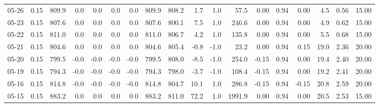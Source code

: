 \begin{threeparttable}
{\begin{tabular}{lrrrrrrrrrrrrrrrrr}
  05-26 &     0.15 & 809.9 &               0.0 &               0.0 &                0.0 &                0.0 & 809.9 & 808.2 &        1.7 &                      1.0 &                57.5 &       0.00 &      0.94 &           0.00 &              4.5 &            0.56 &                  15.00 \\
  05-23 &     0.15 & 807.6 &               0.0 &               0.0 &                0.0 &                0.0 & 807.6 & 800.1 &        7.5 &                      1.0 &               246.6 &       0.00 &      0.94 &           0.00 &              4.9 &            0.62 &                  15.00 \\
  05-22 &     0.15 & 811.0 &               0.0 &               0.0 &                0.0 &                0.0 & 811.0 & 806.7 &        4.2 &                      1.0 &               135.8 &       0.00 &      0.94 &           0.00 &              5.5 &            0.68 &                  15.00 \\
  05-21 &     0.15 & 804.6 &               0.0 &               0.0 &                0.0 &                0.0 & 804.6 & 805.4 &       -0.8 &                     -1.0 &                23.2 &       0.00 &      0.94 &           0.15 &             19.0 &            2.36 &                  20.00 \\
  05-20 &     0.15 & 799.5 &              -0.0 &              -0.0 &               -0.0 &               -0.0 & 799.5 & 808.0 &       -8.5 &                     -1.0 &               254.0 &      -0.15 &      0.94 &           0.00 &             19.4 &            2.40 &                  20.00 \\
  05-19 &     0.15 & 794.3 &              -0.0 &              -0.0 &               -0.0 &               -0.0 & 794.3 & 798.0 &       -3.7 &                     -1.0 &               108.4 &      -0.15 &      0.94 &           0.00 &             19.2 &            2.41 &                  20.00 \\
  05-16 &     0.15 & 814.8 &              -0.0 &              -0.0 &               -0.0 &               -0.0 & 814.8 & 804.7 &       10.1 &                      1.0 &               286.8 &      -0.15 &      0.94 &          -0.15 &             20.8 &            2.59 &                  20.00 \\
  05-15 &     0.15 & 883.2 &               0.0 &               0.0 &                0.0 &                0.0 & 883.2 & 811.0 &       72.2 &                      1.0 &              1991.9 &       0.00 &      0.94 &           0.00 &             20.5 &            2.53 &                  15.00 \\

\end{tabular}}
\end{threeparttable}
